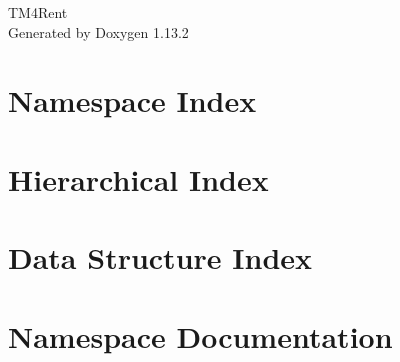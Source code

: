 \documentclass[twoside]{book}
\newcommand{\+}{\discretionary{\mbox{\scriptsize$\hookleftarrow$}}{}{}}
\newcommand{\clearemptydoublepage}{%
    \newpage{\pagestyle{empty}\cleardoublepage}%
  }
\begin{document}
  \raggedbottom
    \hypersetup{pageanchor=false,
                bookmarksnumbered=true,
                pdfencoding=unicode
               }
  \begin{titlepage}
  \vspace*{7cm}
  \begin{center}%
  {\Large TM4\+Rent}\\
  \vspace*{1cm}
  {\large Generated by Doxygen 1.13.2}\\
  \end{center}
  \end{titlepage}
  \clearemptydoublepage
  \tableofcontents
  \clearemptydoublepage
  \hypersetup{pageanchor=true}


\chapter{Namespace Index}

\chapter{Hierarchical Index}

\chapter{Data Structure Index}

\chapter{Namespace Documentation}












\end{document}
